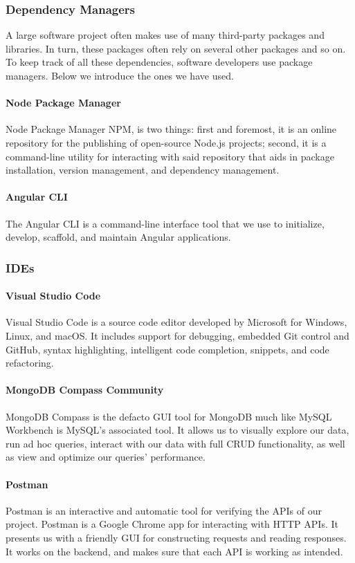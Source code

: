 \subsubsection{Dependency Managers}
A large software project often makes use of many third-party packages and libraries. In turn, these packages
often rely on several other packages and so on. To keep track of all these dependencies, software developers
use package managers. Below we introduce the ones we have used.
\paragraph*{Node Package Manager}
Node Package Manager \ac{NPM}, is two things: first and foremost, it is an online repository for the publishing of open-source Node.js projects; second, it is a command-line utility for interacting with said repository that aids in package installation, version management, and dependency management.
\paragraph*{Angular CLI}
The Angular CLI is a command-line interface tool that we use to initialize, develop, scaffold, and maintain Angular applications. 
\subsubsection{IDEs}

\paragraph*{Visual Studio Code}
Visual Studio Code is a source code editor developed by Microsoft for Windows, Linux, and macOS. It includes support for debugging, embedded Git control and GitHub, syntax highlighting, intelligent code completion, snippets, and code refactoring.


\paragraph*{MongoDB Compass Community}
MongoDB Compass is the defacto GUI tool for MongoDB much like MySQL Workbench is MySQL’s associated tool. It allows us to visually explore our data, run ad hoc queries, interact with our data with full CRUD functionality, as well as view and optimize our queries’ performance.


\paragraph*{Postman}
Postman is an interactive and automatic tool for verifying the APIs of our project. Postman is a Google Chrome app for interacting with HTTP APIs. It presents us with a friendly GUI for constructing requests and reading responses. It works on the backend, and makes sure that each API is working as intended.

